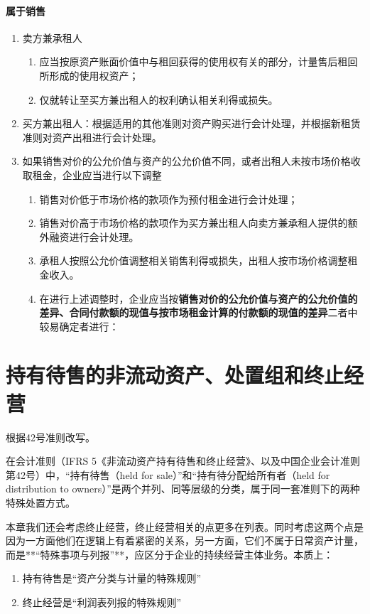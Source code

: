 \documentclass[UTF8,12pt]{ctexart}
\numberwithin{equation}{section} %
\numberwithin{figure}{section}
\numberwithin{table}{section}
\begin{document}
	\paragraph{属于销售}
	\begin{enumerate}
		\item 卖方兼承租人
		\begin{enumerate}
			\item 应当按原资产账面价值中与租回获得的使用权有关的部分，计量售后租回所形成的使用权资产；
			
			\item 仅就转让至买方兼出租人的权利确认相关利得或损失。
		\end{enumerate}
		
		\item 买方兼出租人：根据适用的其他准则对资产购买进行会计处理，并根据新租赁准则对资产出租进行会计处理。

		\item 如果销售对价的公允价值与资产的公允价值不同，或者出租人未按市场价格收取租金，企业应当进行以下调整
		\begin{enumerate}
			\item 销售对价低于市场价格的款项作为预付租金进行会计处理；
			
			\item 销售对价高于市场价格的款项作为买方兼出租人向卖方兼承租人提供的额外融资进行会计处理。
			
			\item 承租人按照公允价值调整相关销售利得或损失，出租人按市场价格调整租金收入。
			
			\item 在进行上述调整时，企业应当按\textbf{销售对价的公允价值与资产的公允价值的差异、合同付款额的现值与按市场租金计算的付款额的现值的差异}二者中较易确定者进行：
		\end{enumerate}
	\end{enumerate}
	
	\newpage
	\section{持有待售的非流动资产、处置组和终止经营}
	根据42号准则改写。
	
	在会计准则（IFRS 5《非流动资产持有待售和终止经营》、以及中国企业会计准则第42号）中，“持有待售（held for sale）”和“持有待分配给所有者（held for distribution to owners）”是两个并列、同等层级的分类，属于同一套准则下的两种特殊处置方式。
	
	
	本章我们还会考虑终止经营，终止经营相关的点更多在列表。同时考虑这两个点是因为一方面他们在逻辑上有着紧密的关系，另一方面，它们不属于日常资产计量，而是**“特殊事项与列报”**，应区分于企业的持续经营主体业务。本质上：
	\begin{enumerate}
		\item 持有待售是“资产分类与计量的特殊规则”
		
		\item 终止经营是“利润表列报的特殊规则”
	\end{enumerate}
	
\end{document}
